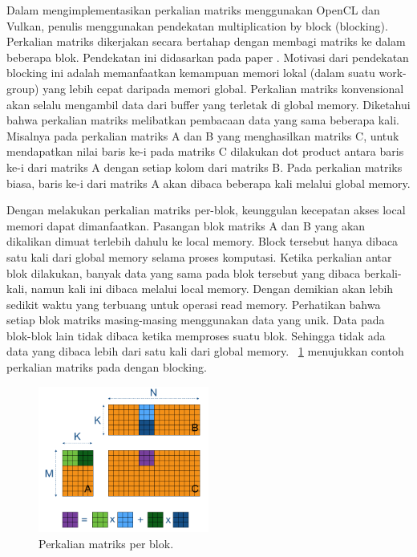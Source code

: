 Dalam mengimplementasikan perkalian matriks menggunakan OpenCL dan Vulkan, penulis menggunakan pendekatan multiplication by block (blocking). Perkalian matriks dikerjakan secara bertahap dengan membagi matriks ke dalam beberapa blok. Pendekatan ini didasarkan pada paper \cite{matmulblock}. Motivasi dari pendekatan blocking ini adalah memanfaatkan kemampuan memori lokal (dalam suatu work-group) yang lebih cepat daripada memori global. Perkalian matriks konvensional akan selalu mengambil data dari buffer yang terletak di global memory. Diketahui bahwa perkalian matriks melibatkan pembacaan data yang sama beberapa kali. Misalnya pada perkalian matriks A dan B yang menghasilkan matriks C, untuk mendapatkan nilai baris ke-i pada matriks C dilakukan dot product antara baris ke-i dari matriks A dengan setiap kolom dari matriks B. Pada perkalian matriks biasa, baris ke-i dari matriks A akan dibaca beberapa kali melalui global memory. 

Dengan melakukan perkalian matriks per-blok, keunggulan kecepatan akses local memori dapat dimanfaatkan. Pasangan blok matriks A dan B yang akan dikalikan dimuat terlebih dahulu ke local memory. Block tersebut hanya dibaca satu kali dari global memory selama proses komputasi. Ketika perkalian antar blok dilakukan, banyak data yang sama pada blok tersebut yang dibaca berkali-kali, namun kali ini dibaca melalui local memory. Dengan demikian akan lebih sedikit waktu yang terbuang untuk operasi read memory. Perhatikan bahwa setiap blok matriks masing-masing menggunakan data yang unik. Data pada blok-blok lain tidak dibaca ketika memproses suatu blok. Sehingga tidak ada data yang dibaca lebih dari satu kali dari global memory. \pic~\ref{fig:matmulblock2} menujukkan contoh perkalian matriks pada dengan blocking.

\begin{figure}
	\centering
	\includegraphics[width=0.50\textwidth]
	{pics/matmul-block1.png}
	\caption{Perkalian matriks per blok.}
	\label{fig:matmulblock2}
\end{figure}

